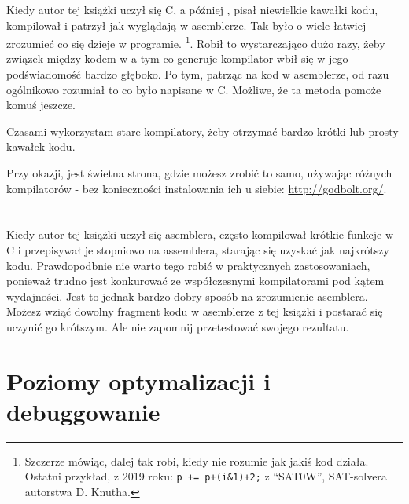 
Kiedy autor tej książki uczył się C, a później \Cpp, pisał niewielkie kawałki kodu, kompilował
i patrzył jak wyglądają w asemblerze. Tak było o wiele łatwiej zrozumieć co się dzieje w programie.%
\footnote{Szczerze mówiąc, dalej tak robi, kiedy nie rozumie jak jakiś kod działa.
Ostatni przykład, z 2019 roku: \verb|p += p+(i&1)+2;| z ``SAT0W'', SAT-solvera autorstwa D. Knutha.}.
Robił to wystarczająco dużo razy, żeby związek między kodem w \CCpp a tym co generuje kompilator wbił się w jego podświadomość bardzo głęboko.
Po tym, patrząc na kod w asemblerze, od razu ogólnikowo rozumiał to co było napisane w C.
Możliwe, że ta metoda pomoże komuś jeszcze.


Czasami wykorzystam stare kompilatory, żeby otrzymać bardzo krótki lub prosty kawałek kodu.

Przy okazji, jest świetna strona, gdzie możesz zrobić to samo, używając różnych kompilatorów - bez konieczności instalowania ich u siebie: \url{http://godbolt.org/}.

\section*{\Exercises}

Kiedy autor tej książki uczył się asemblera, często kompilował krótkie funkcje w C i przepisywał
je stopniowo na assemblera, starając się uzyskać jak najkrótszy kodu.
Prawdopodbnie nie warto tego robić w praktycznych zastosowaniach,
ponieważ trudno jest konkurować ze współczesnymi kompilatorami pod kątem wydajności. Jest to jednak bardzo dobry sposób na zrozumienie asemblera.
Możesz wziąć dowolny fragment kodu w asemblerze z tej książki i postarać się uczynić go krótszym.
Ale nie zapomnij przetestować swojego rezultatu.

\section*{Poziomy optymalizacji i debuggowanie}

